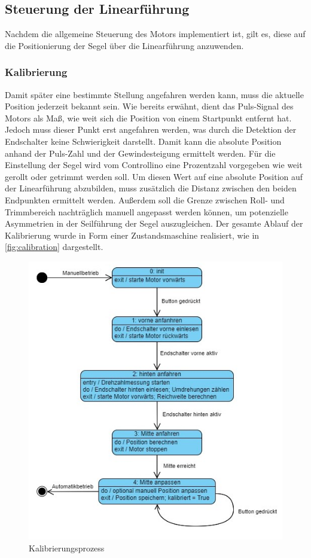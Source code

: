 \subsection{Steuerung der Linearführung}
Nachdem die allgemeine Steuerung des Motors implementiert ist, gilt es, diese auf die Positionierung der Segel über die Linearführung anzuwenden. 
\subsubsection{Kalibrierung}\label{subsubsec:Kalibrierung}
Damit später eine bestimmte Stellung angefahren werden kann, muss die aktuelle Position jederzeit bekannt sein. Wie bereits erwähnt, dient das Puls-Signal des Motors als Maß, wie weit sich die Position von einem Startpunkt entfernt hat. Jedoch muss dieser Punkt erst angefahren werden, was durch die Detektion der Endschalter keine Schwierigkeit darstellt. Damit kann die absolute Position anhand der Puls-Zahl und der Gewindesteigung ermittelt werden. Für die Einstellung der Segel wird vom Controllino eine Prozentzahl vorgegeben wie weit gerollt oder getrimmt werden soll. Um diesen Wert auf eine absolute Position auf der Linearführung abzubilden, muss zusätzlich die Distanz zwischen den beiden Endpunkten ermittelt werden. Außerdem soll die Grenze zwischen Roll- und Trimmbereich nachträglich manuell angepasst werden können, um potenzielle Asymmetrien in der Seilführung der Segel auszugleichen. Der gesamte Ablauf der Kalibrierung wurde in Form einer Zustandsmaschine realisiert, wie in \autoref{fig:calibration} dargestellt.
\begin{figure}[H]
	\centering
	\includegraphics[width=0.8\linewidth]{images/Software/Kalibrierungsprozess.jpg}
	\caption{Kalibrierungsprozess}
	\label{fig:calibration}
\end{figure}
